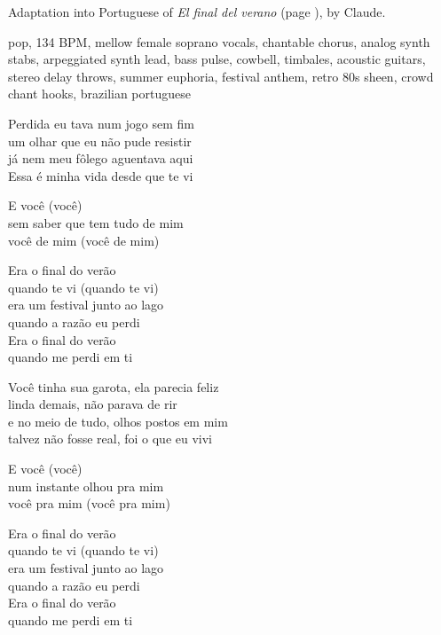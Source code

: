 
\begin{notes}
Adaptation into Portuguese of \emph{El final del verano} (page \pageref{sec:verano}), by Claude.
\end{notes}
\begin{style}
pop, 134 BPM, mellow female soprano vocals, chantable chorus, analog synth stabs, arpeggiated synth lead, bass pulse, cowbell, timbales, acoustic guitars, stereo delay throws, summer euphoria, festival anthem, retro 80s sheen, crowd chant hooks, brazilian portuguese
\end{style}
\begin{lyrics}
Perdida eu tava num jogo sem fim\\
um olhar que eu não pude resistir\\
já nem meu fôlego aguentava aqui\\
Essa é minha vida desde que te vi

E você (você)\\
sem saber que tem tudo de mim\\
você de mim (você de mim)

Era o final do verão\\
quando te vi (quando te vi)\\
era um festival junto ao lago\\
quando a razão eu perdi\\
Era o final do verão\\
quando me perdi em ti

Você tinha sua garota, ela parecia feliz\\
linda demais, não parava de rir\\
e no meio de tudo, olhos postos em mim\\
talvez não fosse real, foi o que eu vivi

E você (você)\\
num instante olhou pra mim\\
você pra mim (você pra mim)

Era o final do verão\\
quando te vi (quando te vi)\\
era um festival junto ao lago\\
quando a razão eu perdi\\
Era o final do verão\\
quando me perdi em ti


\end{lyrics}
